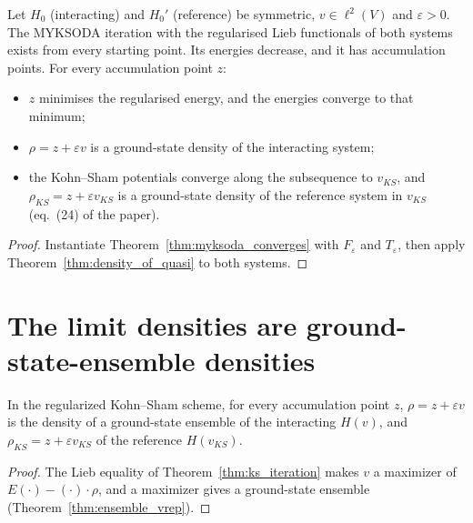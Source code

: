 \begin{theorem}
  \label{thm:ks_iteration}
  \leanok
  Let $H_0$ (interacting) and $H_0'$ (reference) be symmetric, $v\in\ell^2(V)$ and $\varepsilon>0$. The
  MYKSODA iteration with the regularised Lieb functionals of both systems exists from every starting point.
  Its energies decrease, and it has accumulation points. For every accumulation point $z$:
  \begin{itemize}
    \item $z$ minimises the regularised energy, and the energies converge to that minimum;
    \item $\rho=z+\varepsilon v$ is a ground-state density of the interacting system;
    \item the Kohn--Sham potentials converge along the subsequence to $v_{KS}$, and
      $\rho_{KS}=z+\varepsilon v_{KS}$ is a ground-state density of the reference system in $v_{KS}$
      (eq.~(24) of the paper).
  \end{itemize}
\end{theorem}
\begin{proof}
  \leanok
  Instantiate Theorem~\ref{thm:myksoda_converges} with $F_\varepsilon$ and $T_\varepsilon$, then apply
  Theorem~\ref{thm:density_of_quasi} to both systems.
\end{proof}

\section{The limit densities are ground-state-ensemble densities}

\begin{theorem}
  \label{thm:lattice_myksoda_ensemble}
  \leanok
  In the regularized Kohn--Sham scheme, for every accumulation point $z$, $\rho=z+\varepsilon v$ is the density of a
  ground-state ensemble of the interacting $H(v)$, and $\rho_{KS}=z+\varepsilon v_{KS}$ of the reference $H(v_{KS})$.
\end{theorem}
\begin{proof}
  \leanok
  The Lieb equality of Theorem~\ref{thm:ks_iteration} makes $v$ a maximizer of $E(\cdot)-(\cdot)\cdot\rho$, and a maximizer
  gives a ground-state ensemble (Theorem~\ref{thm:ensemble_vrep}).
\end{proof}
